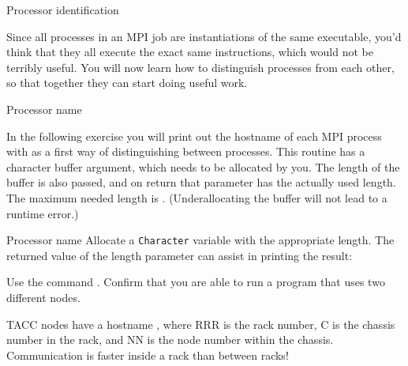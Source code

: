 
 {Processor identification}
\label{sec:rank-size}

Since all processes in an MPI job are instantiations of the same executable,
you'd think that they all execute the exact same instructions,
which would not be terribly useful.
You will now learn how to distinguish
processes from each other, so that together they can start doing
useful work.

 {Processor name}

In the following exercise you will print out the hostname 
of each MPI process
%
with
%
as a first way of distinguishing between processes.
This routine has a character buffer argument, which
needs to be allocated by you.
The length of the buffer is also passed,
and on return that parameter has the actually used length.
The maximum needed length is .
%
%
(Underallocating the buffer will not lead to a runtime error.)

\begin{fortrannote}{Processor name}
  Allocate a \lstinline{Character} variable with
  the appropriate length.
  The returned value of the length parameter can assist 
  in printing the result:

\end{fortrannote}

\begin{exercise}
  \label{ex:procname}
  Use the command .
  Confirm that you are able to run a program that uses two different nodes.

\begin{tacc}
    TACC nodes have a hostname , where RRR is the rack number, C is the chassis
    number in the rack, and NN is the node number within the chassis. Communication
    is faster inside a rack than between racks!
\end{tacc}
\end{exercise}

